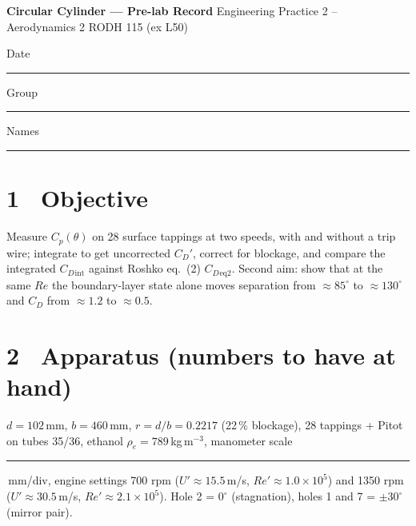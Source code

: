 \documentclass[9pt,a4paper]{extarticle}
\newcommand{\Cp}{\ensuremath{C_p}}
\newcommand{\CD}{\ensuremath{C_D}}
\newcommand{\ReD}{\ensuremath{\mathit{Re}}}
\newcommand{\blank}{\rule{1.5cm}{0.4pt}}
\begin{document}
{\large\bfseries Circular Cylinder --- Pre-lab Record}\hfill
{\small Engineering Practice 2 -- Aerodynamics 2 \quad RODH 115 (ex L50)}\\[1pt]
{\small Date \blank \qquad Group \blank \qquad Names \blank}

\section*{1 \ Objective}
Measure $\Cp(\theta)$ on 28 surface tappings at two speeds, with and without a trip wire;
integrate to get uncorrected $\CD'$, correct for blockage, and compare the integrated
$\CD{}_{\text{int}}$ against Roshko eq.~(2) $\CD{}_{\text{eq2}}$. Second aim: show that at the
same $\ReD$ the boundary-layer state alone moves separation from $\approx85^\circ$ to
$\approx130^\circ$ and $\CD$ from $\approx1.2$ to $\approx0.5$.

\section*{2 \ Apparatus (numbers to have at hand)}
$d = 102$\,mm, $b = 460$\,mm, $r = d/b = 0.2217$ (22\,\% blockage), 28 tappings + Pitot on
tubes 35/36, ethanol $\rho_e = 789$\,kg\,m$^{-3}$, manometer scale \blank\,mm/div,
engine settings 700 rpm ($U'\approx15.5$\,m/s, $\ReD'\approx1.0\times10^{5}$) and
1350 rpm ($U'\approx30.5$\,m/s, $\ReD'\approx2.1\times10^{5}$).
Hole 2 = $0^\circ$ (stagnation), holes 1 and 7 = $\pm30^\circ$ (mirror pair).
\par\vspace{3pt}
\noindent{}
\end{document}
